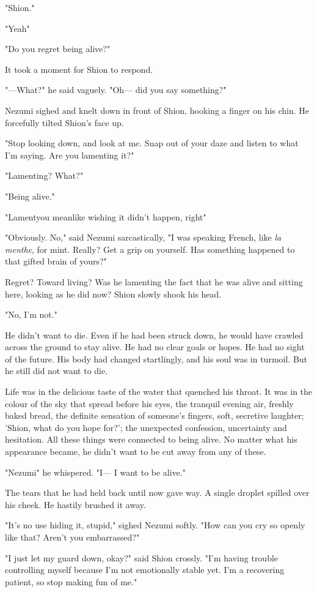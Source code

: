 "Shion."

"\el Yeah\el "

"Do you regret being alive?"

It took a moment for Shion to respond.

"---What?" he said vaguely. "Oh--- did you say something?"

Nezumi sighed and knelt down in front of Shion, hooking a finger on his
chin. He forcefully tilted Shion's face up.

"Stop looking down, and look at me. Snap out of your daze and listen to
what I'm saying. Are you lamenting it?"

"Lamenting\el ? What?"

"Being alive."

"Lament\el you mean\el like wishing it didn't happen, right\el "

"Obviously. No," said Nezumi sarcastically, "I was speaking French, like
\emph{la menthe}, for mint. Really? Get a grip on yourself. Has
something happened to that gifted brain of yours?"

Regret? Toward living? Was he lamenting the fact that he was alive and
sitting here, looking as he did now? Shion slowly shook his head.

"No, I'm not."

He didn't want to die. Even if he had been struck down, he would have
crawled across the ground to stay alive. He had no clear goals or hopes.
He had no sight of the future. His body had changed startlingly, and his
soul was in turmoil. But he still did not want to die.

Life was in the delicious taste of the water that quenched his throat.
It was in the colour of the sky that spread before his eyes, the
tranquil evening air, freshly baked bread, the definite sensation of
someone's fingers, soft, secretive laughter; 'Shion, what do you hope
for?'; the unexpected confession, uncertainty and hesitation. All these
things were connected to being alive. No matter what his appearance
became, he didn't want to be cut away from any of these.

"Nezumi\el " he whispered. "I--- I want to be alive."

The tears that he had held back until now gave way. A single droplet
spilled over his cheek. He hastily brushed it away.

"It's no use hiding it, stupid," sighed Nezumi softly. "How can you cry
so openly like that? Aren't you embarrassed?"

"I just let my guard down, okay?" said Shion crossly. "I'm having
trouble controlling myself because I'm not emotionally stable yet. I'm a
recovering patient, so stop making fun of me."

